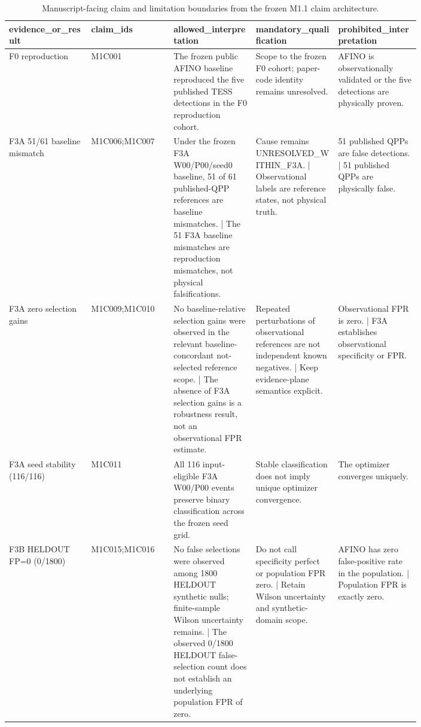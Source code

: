 \begin{table}[t]
\centering
\small
\caption{Manuscript-facing claim and limitation boundaries from the frozen M1.1 claim architecture.}
\label{tab:m1\_claim\_boundaries}
\begin{tabular}{p{0.16\linewidth}p{0.16\linewidth}p{0.16\linewidth}p{0.16\linewidth}p{0.16\linewidth}}
\hline
\textbf{evidence\_or\_result} & \textbf{claim\_ids} & \textbf{allowed\_interpretation} & \textbf{mandatory\_qualification} & \textbf{prohibited\_interpretation} \\
\hline
F0 reproduction & M1C001 & The frozen public AFINO baseline reproduced the five published TESS detections in the F0 reproduction cohort. & Scope to the frozen F0 cohort; paper-code identity remains unresolved. & AFINO is observationally validated or the five detections are physically proven. \\
F3A 51/61 baseline mismatch & M1C006;M1C007 & Under the frozen F3A W00/P00/seed0 baseline, 51 of 61 published-QPP references are baseline mismatches. | The 51 F3A baseline mismatches are reproduction mismatches, not physical falsifications. & Cause remains UNRESOLVED\_WITHIN\_F3A. | Observational labels are reference states, not physical truth. & 51 published QPPs are false detections. | 51 published QPPs are physically false. \\
F3A zero selection gains & M1C009;M1C010 & No baseline-relative selection gains were observed in the relevant baseline-concordant not-selected reference scope. | The absence of F3A selection gains is a robustness result, not an observational FPR estimate. & Repeated perturbations of observational references are not independent known negatives. | Keep evidence-plane semantics explicit. & Observational FPR is zero. | F3A establishes observational specificity or FPR. \\
F3A seed stability (116/116) & M1C011 & All 116 input-eligible F3A W00/P00 events preserve binary classification across the frozen seed grid. & Stable classification does not imply unique optimizer convergence. & The optimizer converges uniquely. \\
F3B HELDOUT FP=0 (0/1800) & M1C015;M1C016 & No false selections were observed among 1800 HELDOUT synthetic nulls; finite-sample Wilson uncertainty remains. | The observed 0/1800 HELDOUT false-selection count does not establish an underlying population FPR of zero. & Do not call specificity perfect or population FPR zero. | Retain Wilson uncertainty and synthetic-domain scope. & AFINO has zero false-positive rate in the population. | Population FPR is exactly zero. \\

\end{tabular}
\end{table}
